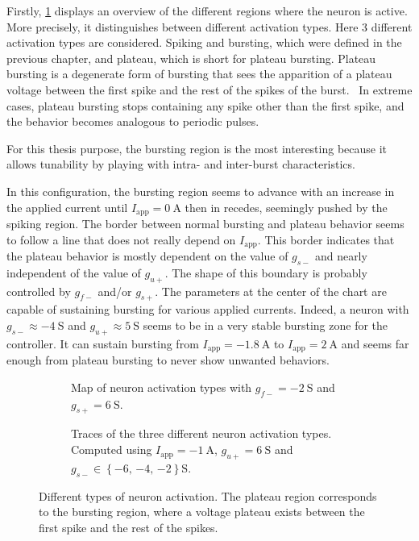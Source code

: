 Firstly, \cref{fig:neuron_activation} displays an overview of the different regions where the neuron is active.
More precisely, it distinguishes between different activation types. Here 3 different activation types are considered.
Spiking and bursting, which were defined in the previous chapter, and plateau, which is short for plateau bursting.
Plateau bursting is a degenerate form of bursting that sees the apparition of a plateau voltage between the first spike and the rest of the spikes of the burst. 
In extreme cases, plateau bursting stops containing any spike other than the first spike, and the behavior becomes analogous to periodic pulses.

For this thesis purpose, the bursting region is the most interesting because it allows tunability by playing with intra- and inter-burst characteristics.

In this configuration, the bursting region seems to advance with an increase in the applied current until $I_\text{app}=\qty{0}{\ampere}$ then in recedes, seemingly pushed by the spiking region.
The border between normal bursting and plateau behavior seems to follow a line that does not really depend on $I_\text{app}$.
This border indicates that the plateau behavior is mostly dependent on the value of $g_{s-}$ and nearly independent of the value of $g_{u+}$.
The shape of this boundary is probably controlled by $g_{f-}$ and/or $g_{s+}$.
The parameters at the center of the chart are capable of sustaining bursting for various applied currents.
Indeed, a neuron with $g_{s-} \approx \qty{-4}{\siemens}$ and $g_{u+} \approx \qty{5}{\siemens}$ seems to be in a very stable bursting zone for the controller. It can sustain bursting from $I_\text{app} = \qty{-1.8}{\ampere}$ to $I_\text{app} = \qty{2}{\ampere}$ and seems far enough from plateau bursting to never show unwanted behaviors.

\begin{figure}[!htbp]
    \centering
    \begin{subfigure}[t]{\textwidth}
        \centering
        \caption{Map of neuron activation types with $g_{f-} =  \qty{-2}{\siemens}$ and $g_{s+} =  \qty{6}{\siemens}$.}
    \end{subfigure}
    
    \begin{subfigure}[b]{\textwidth}
        \centering
        \caption{Traces of the three different neuron activation types. Computed using $I_\text{app} = \qty{-1}{\ampere}$, $g_{u+} = \qty{6}{\siemens}$ and $g_{s-}  \in \left\{\num{-6},\,\num{-4},\,\num{-2}\right\}\unit{\siemens}$.}
    \end{subfigure}
    \caption{Different types of neuron activation. The plateau region corresponds to the bursting region, where a voltage plateau exists between the first spike and the rest of the spikes.}
    \label{fig:neuron_activation}
\end{figure}


